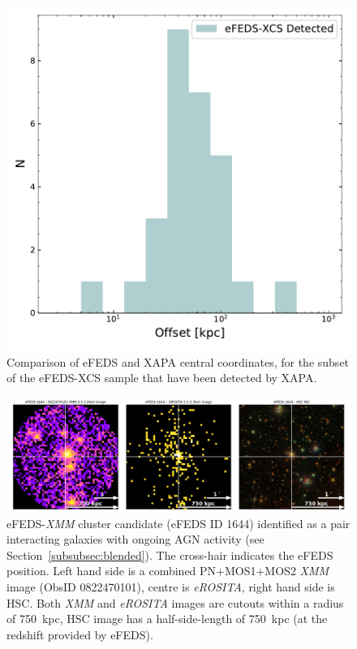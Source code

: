 \documentclass[fleqn,usenatbib]{mnras}
\begin{document}
\begin{figure}
    \centering
    \includegraphics[width=0.95\columnwidth]{images/eFEDS_XAPA_offset.pdf}
    \caption[]{Comparison of eFEDS and XAPA central coordinates, for the subset of the eFEDS-XCS sample that have been detected by XAPA.}
    \label{fig:centcoords}
\end{figure}

\begin{figure}
    \centering
    \includegraphics[width=1\textwidth]{images/interacting_agn_hsc_750kpc.png}
    \caption[]{eFEDS-{\em XMM} cluster candidate (eFEDS ID 1644) identified as a pair interacting galaxies with ongoing AGN activity (see Section~\ref{subsubsec:blended}). The cross-hair indicates the eFEDS position. Left hand side is a combined PN+MOS1+MOS2 {\em XMM} image (ObsID 0822470101), centre is {\em eROSITA}, right hand side is HSC. Both {\em XMM} and {\em eROSITA} images are cutouts within a radius of 750~kpc, HSC image has a half-side-length of 750~kpc (at the redshift provided by eFEDS).}
    \label{fig:pairagn}
\end{figure}
\end{document}

